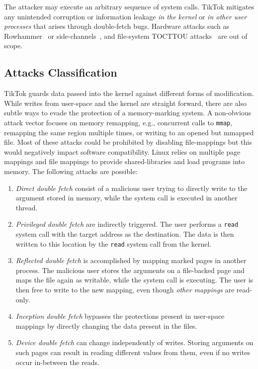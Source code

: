 \documentclass[conference]{IEEEtran}
\newcommand{\sysname}{TikTok}
\begin{document}
The attacker may execute an arbitrary sequence of system calls. \sysname{}
mitigates any unintended corruption or information leakage \emph{in the kernel}
or \emph{in other user processes} that arises through
double-fetch bugs. Hardware attacks such as Rowhammer~\cite{mutlu2019rowhammer}
or side-channels~\cite{kocher2019spectre}, and file-system TOCTTOU
attacks~\cite{payer2012protecting, pu2006methodical, wei2010modeling,
tsafrir2008portably} are out of scope.

\subsection{Attacks Classification}
\label{sec:attacks}

\sysname{} guards data passed into the kernel against different forms of
modification. While writes from user-space and the kernel are straight forward,
there are also subtle ways to evade the protection of a memory-marking system. 
A non-obvious attack vector focuses on memory remapping, e.g., concurrent calls
to \texttt{mmap}, remapping the same region multiple times, or writing to an
opened but mmapped file.
Most of these attacks could be prohibited by disabling file-mappings but this
would negatively impact software compatibility.
Linux relies on multiple page mappings and file mappings to provide shared-libraries and load
programs into memory.
The following attacks are possible:
\begin{enumerate}
  \item \label{attk:direct} \emph{Direct double fetch} consist of a malicious
  user trying to directly write to the argument stored in memory, while the
  system call is executed in another thread. 

  \item \label{attk:systemcall} \emph{Privileged double fetch} are indirectly triggered.
  The user performs a \texttt{read} system call with the target address as the
  destination. The data is then written to this location by the \texttt{read}
  system call from the kernel.

  \item \label{attk:remapping} \emph{Reflected double fetch} is accomplished by
  mapping marked pages in another process. The malicious user stores the
  arguments on a file-backed page and maps the file again as writable, while the
  system call is executing. The user is then free to write to the new mapping,
  even though \emph{other mappings} are read-only. 

  \item \label{attk:writebuffers} \emph{Inception double fetch}
  bypasses the protections present in user-space mappings by directly changing
  the data present in the files.

  \item \label{attk:devicefiles} \emph{Device double fetch} can change
  independently of writes. Storing arguments on such pages can result in reading
  different values from them, even if no writes occur in-between the reads.

\end{enumerate}
\end{document}
